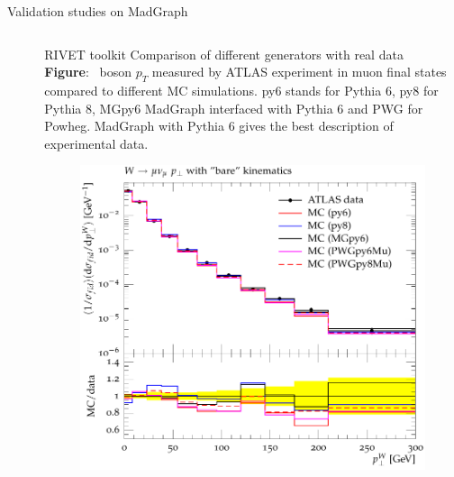 \begin{frame}{Validation studies on MadGraph}
\begin{columns}
\begin{column}{.50\textwidth}
\begin{figure}[!Hhtbp]
\begin{center}
  \end{center}
\end{figure}
\end{column}

\begin{column}{.50\textwidth}
  \begin{block}{RIVET toolkit}\tiny
    Comparison of different generators with real data \\
    \textbf{Figure}: \W~boson $p_{T}$ measured by ATLAS experiment in muon final states compared to different MC simulations. py6 stands for Pythia 6, py8 for Pythia 8, MGpy6 MadGraph interfaced with Pythia 6 and PWG for Powheg. MadGraph with Pythia 6 gives the best description of experimental data.
  \end{block}
  \begin{figure}[!Hhtbp]
  \begin{center}
    \includegraphics[width=1.0\textwidth]{../figs/Wpt_rivet.png}
  \end{center}
\end{figure}
\end{column}
\end{columns}

\end{frame}